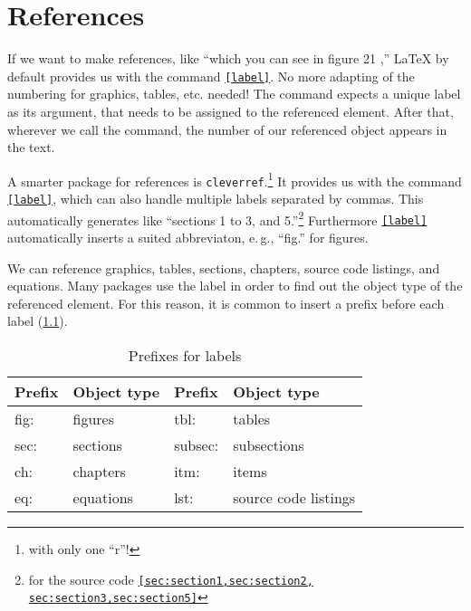 \chapter{References}
\label{sec:references}

If we want to make references, like \enquote{\textellipsis which you can see in figure 21 \textellipsis,} \LaTeX{} by default provides us with the command \texttt{\ref{label}}. No more adapting of the numbering for graphics, tables, etc. needed!
The command expects a unique label as its argument, that needs to be assigned to 
the referenced element. After that, wherever we call the command, the number of 
our referenced object appears in the text.

A smarter package for references is \texttt{cleverref}.\footnote{with only one \enquote{r}!}
It provides us with the command \texttt{\cref{label}}, which can also handle multiple labels separated by commas.
This automatically generates  like \enquote{sections 1 to 3, and 5.}\footnote{for the source code \texttt{\cref{sec:section1,sec:section2,
sec:section3,sec:section5}}}
Furthermore \texttt{\cref{label}} automatically inserts a suited abbreviaton, e.\,g., \enquote{fig.} for figures.

We can reference graphics, tables, sections, chapters, source code listings, and equations. 
Many packages use the label in order to find out the object type of the referenced element.
For this reason, it is common to insert a prefix before each label (\cref{lst:reference-prefixes}).

\begin{table}[H]
  \centering
  \begin{tabular}{@{}llll@{}}
    \toprule
    Prefix & Object type & Prefix & Object type \\ \midrule
    fig: & figures & tbl:    & tables            \\ 
    sec: & sections  & subsec: & subsections     \\
    ch:  & chapters     & itm:    & items \\
    eq:  & equations & lst:    & source code listings  \\ \bottomrule
  \end{tabular}
  \caption{Prefixes for labels}
  \label{lst:reference-prefixes}
\end{table}

